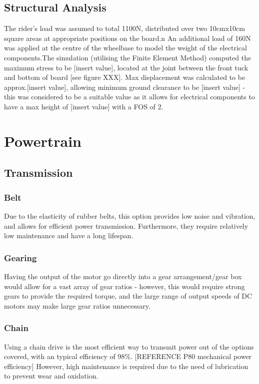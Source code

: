 \documentclass[journal,10pt]{IEEEtran}
\begin{document}
    \subsection{Structural Analysis}
        The rider's load was assumed to total 1100N, distributed over two 10cmx10cm square areas at appropriate positions on the board.n An additional load of 160N was applied at the centre of the wheelbase to model the weight of the electrical components.The simulation (utilising the Finite Element Method) computed the maximum stress to be [insert value], located at the joint between the front tuck and bottom of board [see figure XXX]. Max displacement was calculated to be approx.[insert value], allowing minimum ground clearance to be [insert value] - this was considered to be a suitable value as it allows for electrical components to have a max height of [insert value] with a FOS of 2.
    
\section{Powertrain}
    \subsection{Transmission}
        \subsubsection{Belt}
            Due to the elasticity of rubber belts, this option provides low noise and vibration, and allows for efficient power transmission. Furthermore, they require relatively low maintenance and have a long lifespan. 
        \subsubsection{Gearing}
            Having the output of the motor go directly into a gear arrangement/gear box would allow for a vast array of gear ratios - however, this would require strong gears to provide the required torque, and the large range of output speeds of DC motors may make large gear ratios unnecessary.
        \subsubsection{Chain}
            Using a chain drive is the most efficient way to transmit power out of the options covered, with an typical efficiency of 98\%. [REFERENCE P80 mechanical power efficiency] However, high maintenance is required due to the need of lubrication to prevent wear and oxidation. 
\end{document}
